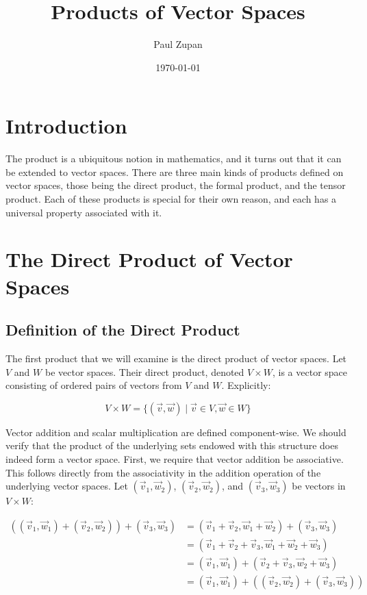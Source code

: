 \documentclass[12pt, titlepage]{article}
\title{Products of Vector Spaces}
\author{Paul Zupan}
\date{\today}
\begin{document}
\maketitle

\section{Introduction}

The product is a ubiquitous notion in mathematics, and it turns out that it can
be extended to vector spaces. There are three main kinds of products defined on
vector spaces, those being the direct product, the formal product, and the
tensor product. Each of these products is special for their own reason, and
each has a universal property associated with it.

\section{The Direct Product of Vector Spaces}

\subsection{Definition of the Direct Product}

The first product that we will examine is the direct product of vector spaces.
Let $V$ and $W$ be vector spaces. Their direct product, denoted $V \times W$,
is a vector space consisting of ordered pairs of vectors from $V$ and $W$.
Explicitly:

\begin{displaymath}
  V \times W = \{(\vec{v}, \vec{w}) \mid \vec{v} \in V, \vec{w} \in W\}
\end{displaymath}

Vector addition and scalar multiplication are defined component-wise. We should
verify that the product of the underlying sets endowed with this structure does
indeed form a vector space. First, we require that vector addition be
associative. This follows directly from the associativity in the addition
operation of the underlying vector spaces. Let $(\vec{v}_1, \vec{w}_2)$,
$(\vec{v}_2, \vec{w}_2)$, and $(\vec{v}_3, \vec{w}_3)$ be vectors in $V \times
W$:

\begin{displaymath}
  \begin{split}
    ((\vec{v}_1, \vec{w}_1) + (\vec{v}_2, \vec{w}_2)) + (\vec{v}_3, \vec{w}_3)
      & = (\vec{v}_1 + \vec{v}_2, \vec{w}_1 + \vec{w}_2) + (\vec{v}_3, \vec{w}_3)    \\
      & = (\vec{v}_1 + \vec{v}_2 + \vec{v}_3, \vec{w}_1 + \vec{w}_2 + \vec{w}_3)     \\
      & = (\vec{v}_1, \vec{w}_1) + (\vec{v}_2 + \vec{v}_3, \vec{w}_2 + \vec{w}_3)    \\
      & = (\vec{v}_1, \vec{w}_1) + ((\vec{v}_2, \vec{w}_2) + (\vec{v}_3, \vec{w}_3)) \\
  \end{split}
\end{displaymath}
\end{document}
